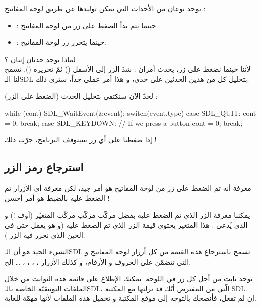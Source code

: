 يوجد نوعان من الأحداث التي يمكن توليدها عن طريق لوحة المفاتيح :

\begin{itemize}
	\item {} :
حينما يتم بدأ الضغط على زر من لوحة المفاتيح.
	\item {} :
حينما يتحرر زر لوحة المفاتيح.
\end{itemize}

لماذا يوجد حدثان إثنان ؟\\
لأننا حينما نضغط على زر، يحدث أمران : شدّ الزر إلى الأسفل
()
ثمّ تحريره 
().
تسمح لنا الـ\textenglish{SDL}
بتحليل كل من هذين الحدثين على حدى، و هذا أمر عملي جداً، سترى ذلك.

لحدّ الآن سنكتفي بتحليل الحدث
(الضغط على الزر) :

\begin{Csource}
while (cont)
{
	SDL_WaitEvent(&event);
	switch(event.type)
	{
		case SDL_QUIT:
		cont = 0;
		break;
		case SDL_KEYDOWN: // If we press a button
		cont = 0;
		break;
	}
}
\end{Csource}

إذا ضغطنا على أي زر سيتوقف البرنامج، جرّب ذلك !

\subsection{استرجاع رمز الزر}

معرفة أنه تم الضغط على زر من لوحة المفاتيح هو أمر جيد، لكن معرفة أي الأزرار تم الضغط عليه بالضبط هو أمر أحسن !

يمكننا معرفة الزر الذي تم الضغط عليه بفضل مركّب مركّب مركّب المتغيّر (أوف !) و الذي يُدعى 
.
 هذا المتغير يحتوي قيمة الزر الذي تم الضغط عليه (و هو يعمل حتى في الحين الذي نحرر فيه الزر
).

\begin{information}
الشيء الجيد هو أن الـ\textenglish{SDL}
تسمح باسترجاع هذه القيمة من كل أزرار لوحة المفاتيح و التي تتضمّن على الحروف و الأرقام، و كذلك الأزرار 
، ، ، ، \dots
إلخ.
\end{information}

يوجد ثابت من أجل كل زر في اللوحة. يمكنك الإطلاع على قائمة هذه الثوابت من خلال الملفات التوثيقيّة الخاصة بالـ\textenglish{SDL}،
الّتي من المفترض أنّك قد نزلتها مع المكتبة 
\textenglish{SDL}.\\
إن لم تفعل، فأنصحك بالتوجه إلى موقع المكتبة و تحميل هذه الملفات لأنها مهمّة للغاية.

